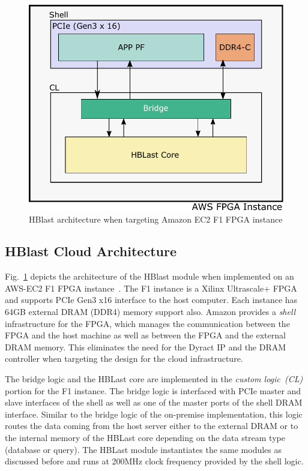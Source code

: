 \begin{figure}[t!]
\centering
\includegraphics[width=0.9\columnwidth]{Figures/AwsArch.pdf}
\caption{HBlast architecture when targeting Amazon EC2 F1 FPGA instance} \label{fig:awsArch}
\end{figure}

\subsection{HBlast Cloud Architecture}
Fig.~\ref{fig:awsArch} depicts the architecture of the HBlast module when implemented on an AWS-EC2 F1 FPGA instance~\cite{aws2018}.
The F1 instance is a Xilinx Ultrascale+ FPGA and supports PCIe Gen3 x16 interface to the host computer.
Each instance has 64GB external DRAM (DDR4) memory support also.
Amazon provides a \emph{shell} infrastructure for the FPGA, which manages the communication between the FPGA and the host machine as well as between the FPGA and the external DRAM memory.
This eliminates the need for the Dyract IP and the DRAM controller when targeting the design for the cloud infrastructure.

The bridge logic and the HBLast core are implemented in the \emph{custom logic~(CL)} portion for the F1 instance.
The bridge logic is interfaced with PCIe master and slave interfaces of the shell as well as one of the master ports of the shell DRAM interface.
Similar to the bridge logic of the on-premise implementation, this logic routes the data coming from the host server either to the external DRAM or to the internal memory of the HBLast core depending on the data stream type (database or query).  
The HBLast module instantiates the same modules as discussed before and runs at 200MHz clock frequency provided by the shell logic.